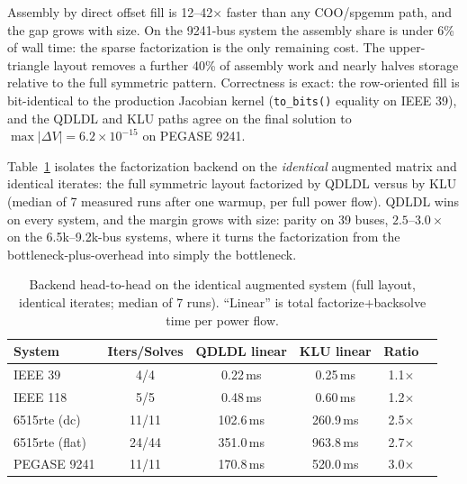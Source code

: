 \documentclass[11pt]{article}
\begin{document}
Assembly by direct offset fill is 12--42$\times$ faster than any
COO/spgemm path, and the gap grows with size. On the 9241-bus system the
assembly share is under 6\% of wall time: the sparse factorization is the
only remaining cost. The upper-triangle layout removes a further 40\% of
assembly work and nearly halves storage relative to the full symmetric
pattern. Correctness is exact: the row-oriented fill is bit-identical to
the production Jacobian kernel (\texttt{to\_bits()} equality on IEEE 39),
and the QDLDL and KLU paths agree on the final solution to
$\max|\Delta V| = 6.2\times10^{-15}$ on PEGASE 9241.

Table~\ref{tab:backend} isolates the factorization backend on the
\emph{identical} augmented matrix and identical iterates: the full
symmetric layout factorized by QDLDL versus by KLU (median of 7 measured
runs after one warmup, per full power flow). QDLDL wins on every system,
and the margin grows with size: parity on 39 buses, $2.5$--$3.0\times$ on
the 6.5k--9.2k-bus systems, where it turns the factorization from the
bottleneck-plus-overhead into simply the bottleneck.

\begin{table}[h]
\centering
\caption{Backend head-to-head on the identical augmented system (full
layout, identical iterates; median of 7 runs). ``Linear'' is total
factorize+backsolve time per power flow.}
\label{tab:backend}
\begin{tabular}{lccccc}
\toprule
System & Iters/Solves & QDLDL linear & KLU linear & Ratio \\
\midrule
IEEE 39          & 4/4   & 0.22\,ms  & 0.25\,ms  & 1.1$\times$ \\
IEEE 118         & 5/5   & 0.48\,ms  & 0.60\,ms  & 1.2$\times$ \\
6515rte (dc)     & 11/11 & 102.6\,ms & 260.9\,ms & 2.5$\times$ \\
6515rte (flat)   & 24/44 & 351.0\,ms & 963.8\,ms & 2.7$\times$ \\
PEGASE 9241      & 11/11 & 170.8\,ms & 520.0\,ms & 3.0$\times$ \\
\bottomrule
\end{tabular}
\end{table}
\end{document}
